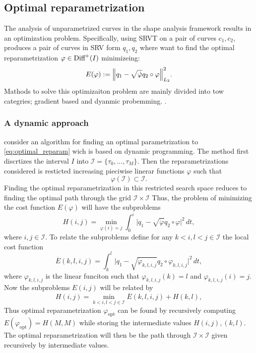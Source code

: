 
\subsection{Optimal reparametrization}
The analysis of unparametrized curves in the shape analysis framework results in an optimization problem. Specifically, using SRVT on a pair of curves \(c_1, c_2\), produces a pair of curves in SRV form \(q_1, q_2\) where want to find the optimal reparametrization \(\varphi \in \text{Diff}^+( I )\) minimizeing: 
\begin{equation}\label{eq:optimal_reparam}
  E(\varphi):=\norm{q_1- \sqrt{\dot\varphi}q_2 \circ \varphi}_{L_2}^2.
\end{equation}
Mathods to solve this optimizaiton problem are mainly divided into tow categries; gradient based and dyanmic probemming. .

\subsubsection{A dynamic approach}
\citeauthor{bauer2017dp} \cite{bauer2017dp} consider an algorithm for finding an optimal parametrization to \eqref{eq:optimal_reparam} wich is based on dynamic programming. The method first discrtizes the interval \(I\) into  \(\mathcal{I} = \{\tau_0, ..., \tau_M\}\). Then the reparametrizations considered is resticted increasing pieciwise linerar functions \(\varphi\) such that
\begin{equation*}
 \varphi(\mathcal{I}) \subset \mathcal{I}. 
\end{equation*}
Finding the optimal reparametrization in this restricted search space reduces to finding the optimal path through the grid \(\mathcal{I}\times\mathcal{I}\)  Thus, the problem of minimizing the cost function \(E(\varphi)\) will have the subproblems 
\begin{equation}
  H(i, j) = \min_{\varphi(i) = j} \int_0^i \vert q_1- \sqrt{\dot\varphi }q_2 \circ \varphi \vert^2 \, dt,
\end{equation}
where \(i,j \in \mathcal{I}\). To relate the subproblems define for any \(k <i, l<j \in \mathcal{I} \) the local cost function 
\begin{equation}
  \overline E(k,l,i,j) =   \int_k^l \vert q_1- \sqrt{\dot\varphi_{k,l,i,j} }q_2 \circ \varphi_{k,l,i,j} \vert^2 \, dt ,
\end{equation}
where \(\varphi_{k,l,i,j} \) is the linear funciton such that \(\varphi_{k,l,i,j}(k)=l\) and \(\varphi_{k,l,i,j}(i)=j\). Now the subproblems \(E(i,j)\) will be related by 
\begin{equation}
  H(i,j)  = \min_{k<i,l<j\in \mathcal{I}}\overline{E}(k,l,i,j) + H(k,l), 
\end{equation}
Thus optimal reparametrization \(\varphi_\text{opt}\) can be found by recursively computing \(E(\varphi_\text{opt})= H(M,M)\) while storing the intermediate values \(H(i,j), (k,l)\). The optimal reparametrization will then be the path through \(\mathcal{I}\times\mathcal{I}\) given recursively by intermediate values. 

